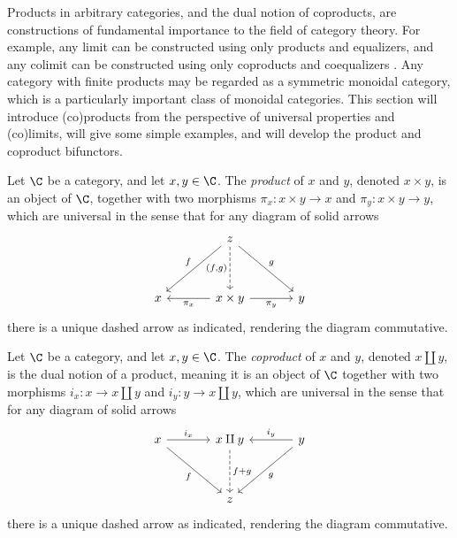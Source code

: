Products in arbitrary categories, and the dual notion of coproducts, are constructions of fundamental importance to the field of category theory. For example, any limit can be constructed using only products and equalizers, and any colimit can be constructed using only coproducts and coequalizers \cite[V.2]{ml}. Any category with finite products may be regarded as a symmetric monoidal category, which is a particularly important class of monoidal categories. This section will introduce (co)products from the perspective of universal properties and (co)limits, will give some simple examples, and will develop the product and coproduct bifunctors.

\begin{definition}\label{A.3.1}
    Let $\C$ be a category, and let $x,y\in\C$. The \emph{product} of $x$ and $y$, denoted $x\times y$, is an object of $\C$, together with two morphisms $\pi_x : x\times y \to x$ and $\pi_y : x\times y \to y$, which are universal in the sense that for any diagram of solid arrows
    \[\begin{tikzcd}[row sep=3.5em, column sep=3.5em]
	& z \\
	x & {x\times y} & y
	\arrow["f"', from=1-2, to=2-1]
	\arrow["{(f,g)}"', dashed, from=1-2, to=2-2]
	\arrow["g", from=1-2, to=2-3]
	\arrow["{\pi_x}", from=2-2, to=2-1]
	\arrow["{\pi_y}"', from=2-2, to=2-3]
    \end{tikzcd}\]
    there is a unique dashed arrow as indicated, rendering the diagram commutative.
\end{definition}

\begin{definition}\label{A.3.2}
    Let $\C$ be a category, and let $x,y\in\C$. The \emph{coproduct} of $x$ and $y$, denoted $x\amalg y$, is the dual notion of a product, meaning it is an object of $\C$ together with two morphisms $i_x : x \to x\amalg y$ and $i_y : y\to x\amalg y$, which are universal in the sense that for any diagram of solid arrows
    \[\begin{tikzcd}[row sep=3.5em, column sep=3.5em]
	x & {x\amalg y} & y \\
	& z
	\arrow["{i_x}", from=1-1, to=1-2]
	\arrow["f"', from=1-1, to=2-2]
	\arrow["{f+g}", dashed, from=1-2, to=2-2]
	\arrow["{i_y}"', from=1-3, to=1-2]
	\arrow["g", from=1-3, to=2-2]
    \end{tikzcd}\]
    there is a unique dashed arrow as indicated, rendering the diagram commutative.
\end{definition}

